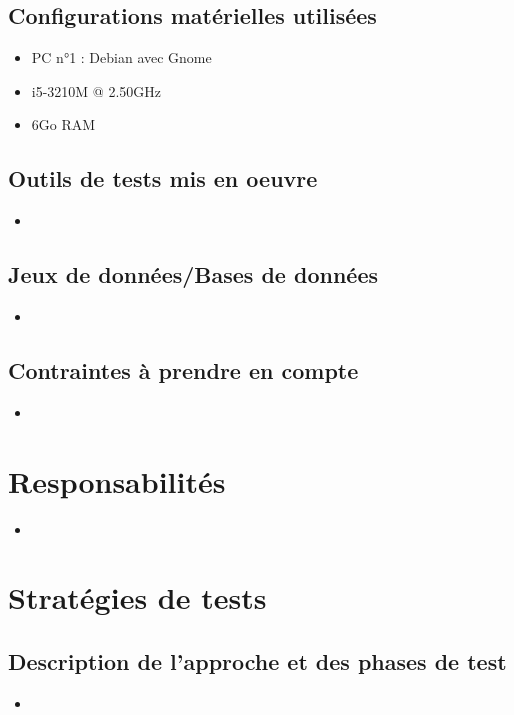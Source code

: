 \documentclass{../res/univ-projet}
\begin{document}
\subsection{Configurations matérielles utilisées}
\begin{itemize}
 \item PC n°1 : Debian avec Gnome
 \item i5-3210M @ 2.50GHz
 \item 6Go RAM

\end{itemize}

\subsection{Outils de tests mis en oeuvre}
\begin{itemize}
 \item 
\end{itemize}

\subsection{Jeux de données/Bases de données}
\begin{itemize}
 \item 
\end{itemize}

\subsection{Contraintes à prendre en compte}
\begin{itemize}
 \item 
\end{itemize}




\section{Responsabilités}

\begin{itemize}
 \item 
\end{itemize}


\section{Stratégies de tests}

\subsection{Description de l'approche et des phases de test}
\begin{itemize}
 \item 
\end{itemize}
\end{document}
